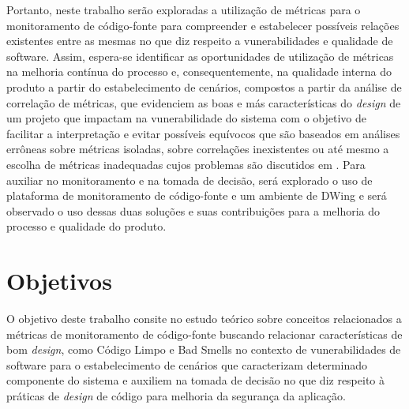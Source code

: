 Portanto, neste trabalho serão exploradas a utilização de métricas para o monitoramento de código-fonte para compreender e estabelecer possíveis relações existentes entre as mesmas no que diz respeito a vunerabilidades e qualidade de software. Assim, espera-se identificar as oportunidades de utilização de métricas na melhoria contínua do processo e, consequentemente, na qualidade interna do produto a partir do estabelecimento de cenários, compostos a partir da análise de correlação de métricas, que evidenciem as boas e más características do \emph{design} de um projeto que impactam na vunerabilidade do sistema com o objetivo de facilitar a interpretação e evitar possíveis equívocos que são baseados em análises errôneas sobre métricas isoladas, sobre correlações inexistentes ou até mesmo a escolha de métricas inadequadas cujos problemas são discutidos em \cite{chidamber1994}. Para auxiliar no monitoramento e na tomada de decisão, será explorado o uso de plataforma de monitoramento de código-fonte e um ambiente de DWing e será observado o uso dessas duas soluções e suas contribuições para a melhoria do processo e qualidade do produto.


\section{Objetivos}


O objetivo deste trabalho consite no estudo teórico sobre conceitos relacionados a métricas de monitoramento de código-fonte buscando relacionar características de bom \emph{design}, como Código Limpo e Bad Smells no contexto de vunerabilidades de software  para o estabelecimento de cenários que caracterizam determinado componente do sistema e auxiliem na tomada de decisão no que diz respeito à práticas de \emph{design} de código para melhoria da segurança da aplicação.

